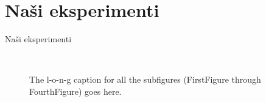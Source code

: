 \documentclass[xcolor=dvipsnames,compress]{beamer}
\begin{document}
\section{Naši eksperimenti}
\label{sec:eksmi}

\begin{frame}{Naši eksperimenti}
%
\begin{figure}[ht!]
    \label{fig:subfigures}
    \begin{center}
        \\ %
%
    \end{center}
   \caption{%
        The l-o-n-g caption for all the subfigures
        (FirstFigure through FourthFigure) goes here.
     }%
\end{figure}
\end{frame}
\end{document}
